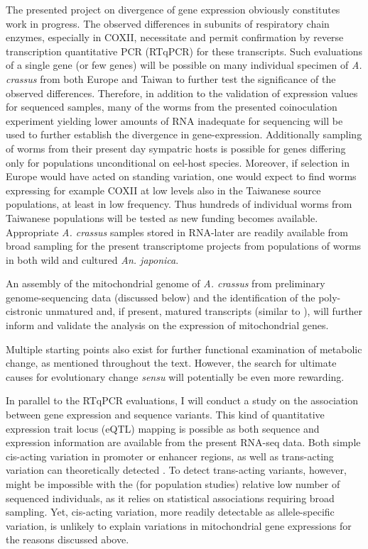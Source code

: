 The presented project on divergence of gene expression obviously
constitutes work in progress. The observed differences in subunits of
respiratory chain enzymes, especially in COXII, necessitate and permit
confirmation by reverse transcription quantitative PCR (RTqPCR) for
these transcripts. Such evaluations of a single gene (or few genes)
will be possible on many individual specimen of \textit{A. crassus}
from both Europe and Taiwan to further test the significance of the
observed differences. Therefore, in addition to the validation of
expression values for sequenced samples, many of the worms from the
presented coinoculation experiment yielding lower amounts of RNA
inadequate for sequencing will be used to further establish the
divergence in gene-expression. Additionally sampling of worms from
their present day sympatric hosts is possible for genes differing only
for populations unconditional on eel-host species. Moreover, if
selection in Europe would have acted on standing variation, one would
expect to find worms expressing for example COXII at low levels also
in the Taiwanese source populations, at least in low frequency. Thus
hundreds of individual worms from Taiwanese populations will be tested
as new funding becomes available. Appropriate \textit{A. crassus}
samples stored in RNA-later are readily available from broad sampling
for the present transcriptome projects from populations of worms in
both wild and cultured \textit{An. japonica}.

An assembly of the mitochondrial genome of \textit{A. crassus} from
preliminary genome-sequencing data (discussed below) and the
identification of the poly-cistronic unmatured and, if present, matured
transcripts (similar to \cite{pmid19843606}), will further inform and
validate the analysis on the expression of mitochondrial genes.

Multiple starting points also exist for further functional examination
of metabolic change, as mentioned throughout the text. However, the
search for ultimate causes for evolutionary change \textit{sensu}
\cite{mayr1961cause} will potentially be even more rewarding.

In parallel to the RTqPCR evaluations, I will conduct a study on the
association between gene expression and sequence variants. This kind
of quantitative expression trait locus (eQTL) mapping is possible as
both sequence and expression information are available from the
present RNA-seq data. Both simple cis-acting variation in promoter or
enhancer regions, as well as trans-acting variation can theoretically
detected \cite{pmid21838806}. To detect trans-acting variants,
however, might be impossible with the (for population studies)
relative low number of sequenced individuals, as it relies on
statistical associations requiring broad sampling. Yet, cis-acting
variation, more readily detectable as allele-specific variation, is
unlikely to explain variations in mitochondrial gene expressions for
the reasons discussed above.

